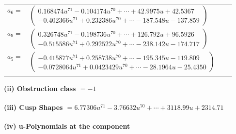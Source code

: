 \documentclass[1p]{elsarticle_modified}
\theoremstyle{definition}
\begin{document}
\begin{tabular}{m{7pt} m{180pt} m{7pt} m{180pt} }
\flushright $a_{6}=$&$\begin{pmatrix}0.168474 u^{71}-0.104174 u^{70}+\cdots+42.9975 u+42.5367\\-0.402366 u^{71}+0.232386 u^{70}+\cdots-187.548 u-137.859\end{pmatrix}$ \\
\flushright $a_{9}=$&$\begin{pmatrix}0.326748 u^{71}-0.198736 u^{70}+\cdots+126.792 u+96.5926\\-0.515586 u^{71}+0.292522 u^{70}+\cdots-238.142 u-174.717\end{pmatrix}$ \\
\flushright $a_{5}=$&$\begin{pmatrix}-0.415877 u^{71}+0.258738 u^{70}+\cdots-195.345 u-119.809\\-0.0728064 u^{71}+0.0423429 u^{70}+\cdots-28.1964 u-25.4350\end{pmatrix}$\\&\end{tabular}
\flushleft \textbf{(ii) Obstruction class $= -1$}\\~\\
\flushleft \textbf{(iii) Cusp Shapes $= 6.77306 u^{71}-3.76632 u^{70}+\cdots+3118.99 u+2314.71$}\\~\\
\newpage\renewcommand{\arraystretch}{1}
\flushleft \textbf{(iv) u-Polynomials at the component}\newline \\
\end{document}
